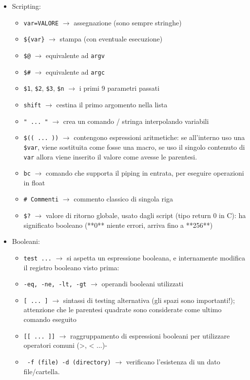 \documentclass[a4paper]{article}
\begin{document}
\begin{itemize}
\item Scripting:
\begin{itemize}
\item\verb|var=VALORE| $\rightarrow$ assegnazione (sono sempre stringhe)
\item\verb|${var}| $\rightarrow$ stampa (con eventuale esecuzione)
\item\verb|$@| $\rightarrow$ equivalente ad \verb|argv|
\item\verb|$#| $\rightarrow$ equivalente ad \verb|argc|
\item\verb|$1|, \verb|$2|, \verb|$3|, \verb|$n| $\rightarrow$ i primi 9 parametri passati
\item\verb|shift| $\rightarrow$ cestina il primo argomento nella lista
\item\verb|" ... "| $\rightarrow$ crea un comando / stringa interpolando variabili
\item\verb|$(( ... ))| $\rightarrow$ contengono espressioni aritmetiche: se all'interno uso una \verb|$var|, viene sostituita come fosse una macro, se uso il singolo contenuto di \verb|var| allora viene inserito il valore come avesse le parentesi.
\item\verb|bc| $\rightarrow$ comando che supporta il piping in entrata, per eseguire operazioni in float
\item\verb|# Commenti| $\rightarrow$ commento classico di singola riga
\item\verb|$?| $\rightarrow$ valore di ritorno globale, usato dagli script (tipo return 0 in C): ha significato booleano (**0** niente errori, arriva fino a **256**)
\end{itemize}

\item Booleani:
\begin{itemize}
\item\verb|test ...| $\rightarrow$ si aspetta un espressione booleana, e internamente modifica il registro booleano visto prima:
\item\verb|-eq, -ne, -lt, -gt| $\rightarrow$ operandi booleani utilizzati
\item\verb|[ ... ]| $\rightarrow$ sintassi di testing alternativa (gli spazi sono importanti!); attenzione che le parentesi quadrate sono considerate come ultimo comando eseguito
\item\verb|[[ ... ]]| $\rightarrow$ raggruppamento di espressioni booleani per utilizzare operatori comuni (>, < ...)- 
\item\verb| -f (file) -d (directory)| $\rightarrow$ verificano l'esistenza di un dato file/cartella. 
\end{itemize}


\end{itemize}
\end{document}
